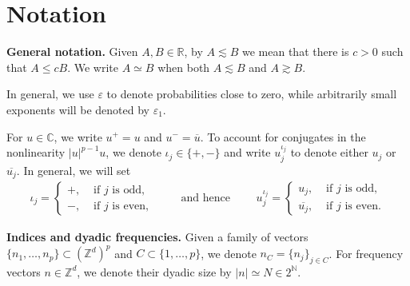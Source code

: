 \documentclass[11pt, xcolor = dvipsnames,reqno
]{amsart}
\theoremstyle{definition}
\theoremstyle{remark}
\begin{document}
   
    
    
\section{Notation}
\label{sec:Notation}

\noindent
\textbf{General notation.}
    Given $A, B \in \mathbb{R}$, 
    by $A \lesssim B$ we mean that there is $c > 0$ such that  $A \leq c B$. 
    We write $A \simeq B$ when both $A \lesssim B$ and $A \gtrsim B$. 
    
    In general, we use $\varepsilon$ to denote probabilities close to zero, while arbitrarily small exponents will be denoted by $\varepsilon_1$. 

    For $u \in \mathbb C$, we write $u^+ = u$ and $u^- = \overline u$.
    To account for conjugates in the nonlinearity $|u|^{p-1} u$, we denote $\iota_j \in \{ +, -\}$ and write $u_j^{\iota_j}$ to denote either $u_j$ or $\overline{u_j}$. 
    In general, we will set 
    \begin{align}\label{eq:def-iotaj}
    \iota_j = \left\{ \begin{array}{cc}
        +,  & \text{ if } j \text{ is odd},  \\
        -, & \text{ if } j \text{ is even},   
    \end{array} \right. 
    \qquad \text{ and hence } \qquad 
    u_j^{\iota_j}
    = \left\{
    \begin{array}{ll}
    u_j,  &  \text{ if } j \text{ is odd},  \\
    \overline{u_j}, & \text{ if } j \text{ is even}.
    \end{array}
    \right.
\end{align}

\noindent
\textbf{Indices and dyadic frequencies.}
Given a family of vectors $\{n_1,\dots,n_p\} \subset (\mathbb{Z}^d)^p$ and $C \subset \{1,\dots,p\}$, we denote $n_C = \{n_j\}_{j \in C}$. 
For frequency vectors $n \in \mathbb Z^d$, we denote their dyadic size by $|n| \simeq N \in 2^{\mathbb N}$.
\end{document}

